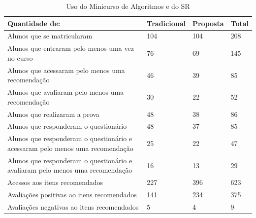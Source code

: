 \begin{table}[h]
\footnotesize
\centering
\caption{Uso do Minicurso de Algoritmos e do SR}
\label{tab:uso-minicurso-sr}
\begin{tabular}{|p{9.5cm}|p{2cm}|p{1.5cm}|p{1cm}|}
\hline
\textbf{Quantidade de:}                                                                     & \textbf{Tradicional} & \textbf{Proposta}    & \textbf{Total}    \\
\hline
Alunos que se matricularam                                                                  & 104                  & 104                  & 208      \\
\hline
Alunos que entraram pelo menos uma vez no curso                                             & 76                   & 69                   & 145      \\
\hline
Alunos que acessaram pelo menos uma recomendação                                            & 46                   & 39                   & 85       \\
\hline
Alunos que avaliaram pelo menos uma recomendação                                            & 30                   & 22                   & 52       \\
\hline
Alunos que realizaram a prova                                                          & 48                   & 38                   & 86       \\
\hline
Alunos que responderam o questionário                                         & 48                   & 37                   & 85       \\
\hline
Alunos que responderam o questionário e acessaram pelo menos uma recomendação & 25                   & 22                   & 47       \\
\hline
Alunos que responderam o questionário e avaliaram pelo menos uma recomendação & 16                   & 13                   & 29       \\
\hline
Acessos aos itens recomendados                                                              & 227                  & 396                  & 623      \\
\hline
Avaliações positivas ao itens recomendados                                                  & 141                  & 234                  & 375      \\
\hline
Avaliações negativas ao itens recomendados                                                  & 5                    & 4                    & 9        \\
\hline
\end{tabular}
\end{table}


